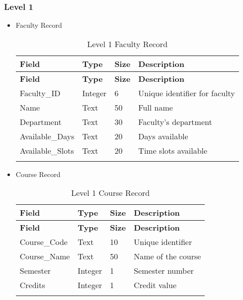 \documentclass[a4paper,12pt]{article}
\begin{document}
\subsubsection{Level 1}
\begin{itemize}
\item Faculty Record
\begin{longtable}{|p{3cm}|p{2cm}|p{1.5cm}|p{6cm}|}
\hline
\textbf{Field} & \textbf{Type} & \textbf{Size} & \textbf{Description} \\
\hline
\endfirsthead

\hline
\textbf{Field} & \textbf{Type} & \textbf{Size} & \textbf{Description} \\
\hline
\endhead

\hline
\endfoot

\hline
\endlastfoot

Faculty\_ID & Integer & 6 & Unique identifier for faculty \\
\hline
Name & Text & 50 & Full name \\
\hline
Department & Text & 30 & Faculty's department \\
\hline
Available\_Days & Text & 20 & Days available \\
\hline
Available\_Slots & Text & 20 & Time slots available \\
\hline
\caption{Level 1 Faculty Record}
\label{tag:placeholder}
\end{longtable}


\item Course Record
\begin{longtable}{|p{3cm}|p{2cm}|p{1.5cm}|p{6cm}|}
\hline
\textbf{Field} & \textbf{Type} & \textbf{Size} & \textbf{Description} \\
\hline
\endfirsthead

\hline
\textbf{Field} & \textbf{Type} & \textbf{Size} & \textbf{Description} \\
\hline
\endhead

\hline
\endfoot

\hline
\endlastfoot

Course\_Code & Text & 10 & Unique identifier \\
\hline
Course\_Name & Text & 50 & Name of the course \\
\hline
Semester & Integer & 1 & Semester number \\
\hline
Credits & Integer & 1 & Credit value \\
\hline
\caption{Level 1 Course Record}
\label{tag:placeholder}
\end{longtable}



\end{itemize}
\end{document}
